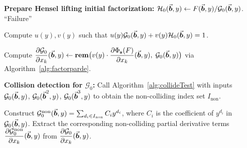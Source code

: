 \documentclass{article}
\numberwithin{equation}{section}
\begin{document}
\begin{algorithm}
\begin{algorithmic}[1]
\textbf{Prepare Hensel lifting initial factorization:}
\State $\mathcal{H}_0(\vec{\boldsymbol{b}},y) \gets F(\vec{\boldsymbol{b}},y) / \mathcal{G}_0(\vec{\boldsymbol{b}},y)$.
 \State \Return ``Failure'' \EndIf

\State Compute $u(y), v(y)$ such that $u(y) \mathcal{G}_0(\vec{\boldsymbol{b}},y) + v(y) \mathcal{H}_0(\vec{\boldsymbol{b}},y) = 1$.

    \State Compute $\dfrac{\partial \mathcal{G}_0}{\partial x_k}(\vec{\boldsymbol{b}},y) \gets \mathbf{rem}\bigl( v(y) \cdot \dfrac{\partial \Phi_{\mathbf{s}}(F)}{\partial x_k}(\vec{\boldsymbol{b}},y),\; \mathcal{G}_0(\vec{\boldsymbol{b}},y) \bigr)$ via Algorithm~\ref{alg:factorparde}.
\EndFor

 \textbf{Collision detection for $\mathcal{G}_0$:}
\State Call Algorithm~\ref{alg:collideTest} with inputs $\mathcal{G}_0(\vec{\boldsymbol{b}},y)$, $\mathcal{G}_0(\vec{\boldsymbol{b}}^2,y)$, $\mathcal{G}_0(\vec{\boldsymbol{b}}^3,y)$ to obtain the non-colliding index set $I_{\text{non}}$.

\State Construct $\mathcal{G}_0^{\text{non}}(\vec{\boldsymbol{b}},y) = \sum_{d_i \in I_{\text{non}}} C_i y^{d_i}$, where $C_i$ is the coefficient of $y^{d_i}$ in $\mathcal{G}_0(\vec{\boldsymbol{b}},y)$.
    \State Extract the corresponding non-colliding partial derivative terms $\dfrac{\partial \mathcal{G}_0^{\text{non}}}{\partial x_k}(\vec{\boldsymbol{b}},y)$ from $\dfrac{\partial \mathcal{G}_0}{\partial x_k}(\vec{\boldsymbol{b}},y)$.
\EndFor

\end{algorithmic}
\end{algorithm}

\end{document}
